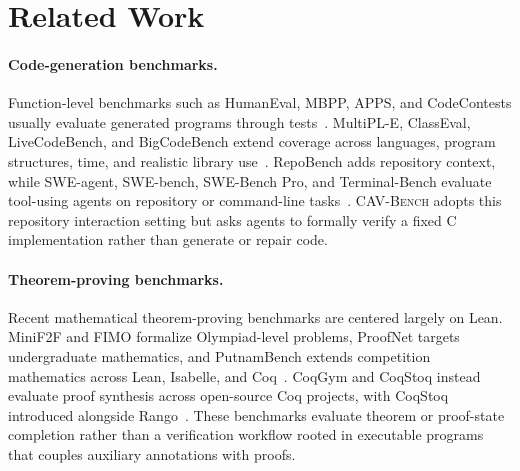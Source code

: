 \section{Related Work}
\label{sec:related-work}

\paragraph{Code-generation benchmarks.}
Function-level benchmarks such as HumanEval, MBPP, APPS, and CodeContests usually evaluate generated programs through tests~\cite{chen2021evaluating,austin2021program,hendrycks2021apps,li2022alphacode}. MultiPL-E, ClassEval, LiveCodeBench, and BigCodeBench extend coverage across languages, program structures, time, and realistic library use~\cite{cassano2022multiple,du2025classeval,jain2025livecodebench,zhuo2025bigcodebench}. RepoBench adds repository context, while SWE-agent, SWE-bench, SWE-Bench Pro, and Terminal-Bench evaluate tool-using agents on repository or command-line tasks~\cite{liu2024repobench,yang2024sweagent,jimenez2024swebench,deng2026swebenchpro,merrill2026terminalbench}. \textsc{CAV-Bench} adopts this repository interaction setting but asks agents to formally verify a fixed C implementation rather than generate or repair code.

\paragraph{Theorem-proving benchmarks.}
Recent mathematical theorem-proving benchmarks are centered largely on Lean. MiniF2F and FIMO formalize Olympiad-level problems, ProofNet targets undergraduate mathematics, and PutnamBench extends competition mathematics across Lean, Isabelle, and Coq~\cite{zheng2021minif2f,liu2023fimo,azerbayev2023proofnet,tsoukalas2024putnambench}. CoqGym and CoqStoq instead evaluate proof synthesis across open-source Coq projects, with CoqStoq introduced alongside Rango~\cite{yang2019learning,thompson2025rango}. These benchmarks evaluate theorem or proof-state completion rather than a verification workflow rooted in executable programs that couples auxiliary annotations with proofs.

